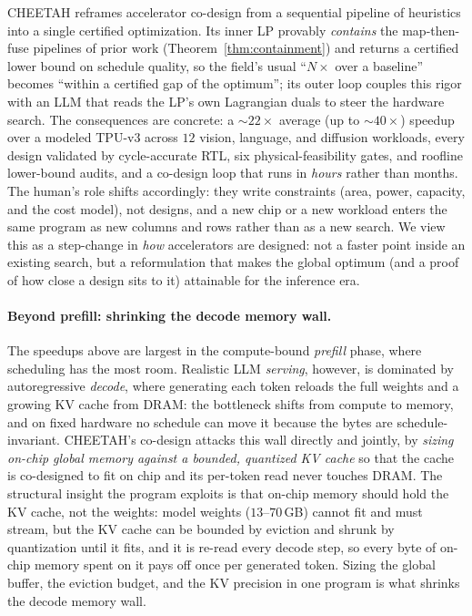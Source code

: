 CHEETAH reframes accelerator co-design from a sequential pipeline of heuristics into a single certified optimization. Its inner LP provably \emph{contains} the map-then-fuse pipelines of prior work (Theorem~\ref{thm:containment}) and returns a certified lower bound on schedule quality, so the field's usual ``$N\times$ over a baseline'' becomes ``within a certified gap of the optimum''; its outer loop couples this rigor with an LLM that reads the LP's own Lagrangian duals to steer the hardware search. The consequences are concrete: a ${\sim}22\times$ average (up to ${\sim}40\times$) speedup over a modeled TPU-v3 across $12$ vision, language, and diffusion workloads, every design validated by cycle-accurate RTL, six physical-feasibility gates, and roofline lower-bound audits, and a co-design loop that runs in \emph{hours} rather than months. The human's role shifts accordingly: they write constraints (area, power, capacity, and the cost model), not designs, and a new chip or a new workload enters the same program as new columns and rows rather than as a new search. We view this as a step-change in \emph{how} accelerators are designed: not a faster point inside an existing search, but a reformulation that makes the global optimum (and a proof of how close a design sits to it) attainable for the inference era.

\paragraph{Beyond prefill: shrinking the decode memory wall.} The speedups above are largest in the compute-bound \emph{prefill} phase, where scheduling has the most room. Realistic LLM \emph{serving}, however, is dominated by autoregressive \emph{decode}, where generating each token reloads the full weights and a growing KV cache from DRAM: the bottleneck shifts from compute to memory, and on fixed hardware no schedule can move it because the bytes are schedule-invariant. CHEETAH's co-design attacks this wall directly and jointly, by \emph{sizing on-chip global memory against a bounded, quantized KV cache} so that the cache is co-designed to fit on chip and its per-token read never touches DRAM. The structural insight the program exploits is that on-chip memory should hold the KV cache, not the weights: model weights ($13$--$70$\,GB) cannot fit and must stream, but the KV cache can be bounded by eviction and shrunk by quantization until it fits, and it is re-read every decode step, so every byte of on-chip memory spent on it pays off once per generated token. Sizing the global buffer, the eviction budget, and the KV precision in one program is what shrinks the decode memory wall.

